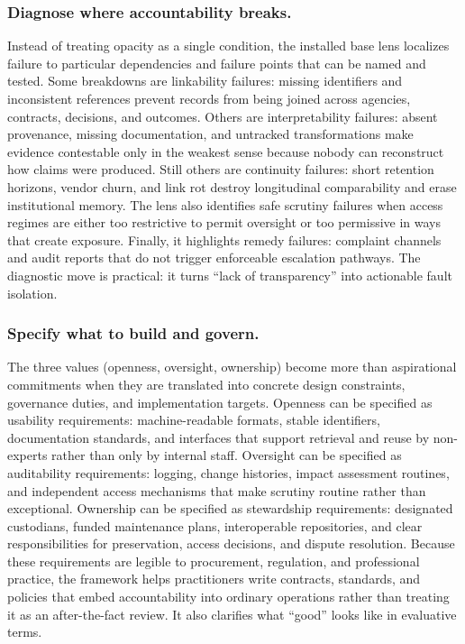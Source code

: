\documentclass[acmsmall,screen]{acmart}
\begin{document}
\subsubsection*{Diagnose where accountability breaks.}
Instead of treating opacity as a single condition, the installed base lens localizes failure to particular dependencies and failure points that can be named and tested. Some breakdowns are linkability failures: missing identifiers and inconsistent references prevent records from being joined across agencies, contracts, decisions, and outcomes. Others are interpretability failures: absent provenance, missing documentation, and untracked transformations make evidence contestable only in the weakest sense because nobody can reconstruct how claims were produced. Still others are continuity failures: short retention horizons, vendor churn, and link rot destroy longitudinal comparability and erase institutional memory. The lens also identifies safe scrutiny failures when access regimes are either too restrictive to permit oversight or too permissive in ways that create exposure. Finally, it highlights remedy failures: complaint channels and audit reports that do not trigger enforceable escalation pathways. The diagnostic move is practical: it turns ``lack of transparency'' into actionable fault isolation.

\subsubsection*{Specify what to build and govern.}
The three values (openness, oversight, ownership) become more than aspirational commitments when they are translated into concrete design constraints, governance duties, and implementation targets. Openness can be specified as usability requirements: machine-readable formats, stable identifiers, documentation standards, and interfaces that support retrieval and reuse by non-experts rather than only by internal staff. Oversight can be specified as auditability requirements: logging, change histories, impact assessment routines, and independent access mechanisms that make scrutiny routine rather than exceptional. Ownership can be specified as stewardship requirements: designated custodians, funded maintenance plans, interoperable repositories, and clear responsibilities for preservation, access decisions, and dispute resolution. Because these requirements are legible to procurement, regulation, and professional practice, the framework helps practitioners write contracts, standards, and policies that embed accountability into ordinary operations rather than treating it as an after-the-fact review. It also clarifies what ``good'' looks like in evaluative terms.
\end{document}
